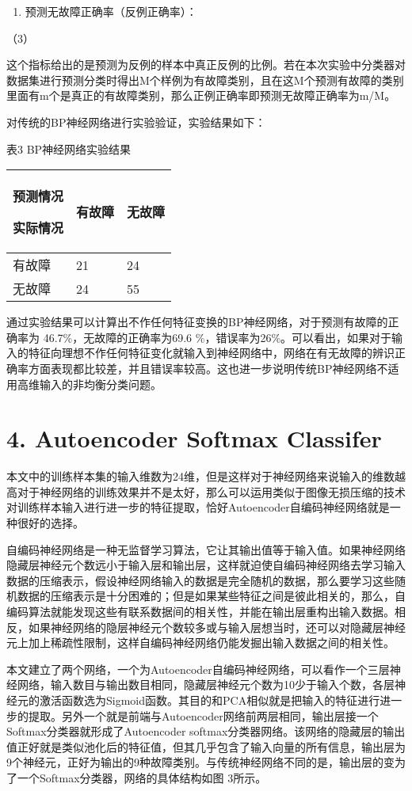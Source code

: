 \begin{enumerate}
\def\labelenumi{\arabic{enumi}.}
\item
  预测无故障正确率（反例正确率）：
\end{enumerate}

（3）

这个指标给出的是预测为反例的样本中真正反例的比例。若在本次实验中分类器对数据集进行预测分类时得出M个样例为有故障类别，且在这M个预测有故障的类别里面有m个是真正的有故障类别，那么正例正确率即预测无故障正确率为m/M。

对传统的BP神经网络进行实验验证，实验结果如下：

表3 BP神经网络实验结果

\begin{longtable}[c]{@{}lll@{}}
\toprule
预测情况

实际情况 & 有故障 & 无故障\tabularnewline
\midrule
\endhead
有故障 & 21 & 24\tabularnewline
无故障 & 24 & 55\tabularnewline
\bottomrule
\end{longtable}

通过实验结果可以计算出不作任何特征变换的BP神经网络，对于预测有故障的正确率为
46.7\%，无故障的正确率为69.6
\%，错误率为26\%。可以看出，如果对于输入的特征向理想不作任何特征变化就输入到神经网络中，网络在有无故障的辨识正确率方面表现都比较差，并且错误率较高。这也进一步说明传统BP神经网络不适用高维输入的非均衡分类问题。

\section{4. Autoencoder Softmax
Classifer}\label{autoencoder-softmax-classifer}

本文中的训练样本集的输入维数为24维，但是这样对于神经网络来说输入的维数越高对于神经网络的训练效果并不是太好，那么可以运用类似于图像无损压缩的技术对训练样本输入进行进一步的特征提取，恰好Autoencoder自编码神经网络就是一种很好的选择。

自编码神经网络是一种无监督学习算法，它让其输出值等于输入值。如果神经网络隐藏层神经元个数远小于输入层和输出层，这样就迫使自编码神经网络去学习输入数据的压缩表示，假设神经网络输入的数据是完全随机的数据，那么要学习这些随机数据的压缩表示是十分困难的；但是如果某些特征之间是彼此相关的，那么，自编码算法就能发现这些有联系数据间的相关性，并能在输出层重构出输入数据。相反，如果神经网络的隐层神经元个数较多或与输入层想当时，还可以对隐藏层神经元上加上稀疏性限制，这样自编码神经网络仍能发掘出输入数据之间的相关性。

本文建立了两个网络，一个为Autoencoder自编码神经网络，可以看作一个三层神经网络，输入数目与输出数目相同，隐藏层神经元个数为10少于输入个数，各层神经元的激活函数选为Sigmoid函数。其目的和PCA相似就是把输入的特征进行进一步的提取。另外一个就是前端与Autoencoder网络前两层相同，输出层接一个Softmax分类器就形成了Autoencoder
softmax分类器网络。该网络的隐藏层的输出值正好就是类似池化后的特征值，但其几乎包含了输入向量的所有信息，输出层为9个神经元，正好为输出的9种故障类别。与传统神经网络不同的是，输出层的变为了一个Softmax分类器，网络的具体结构如图
3所示。


